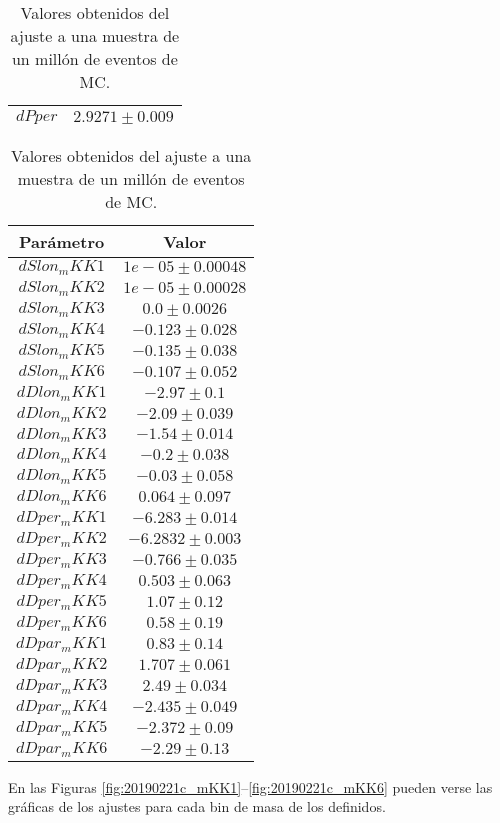 \begin{table}[H]
\begin{multicols}{2}
\begin{tabular}{cc}
$dPper     $&$  2.9271 \pm 0.009  $\\
\bottomrule
\end{tabular}
\begin{tabular}{cc}
\toprule
Parámetro & Valor \\ \midrule
$dSlon_mKK1$&$ 1e-05 \pm 0.00048  $\\
$dSlon_mKK2$&$ 1e-05 \pm 0.00028  $\\
$dSlon_mKK3$&$   0.0 \pm 0.0026   $\\
$dSlon_mKK4$&$  -0.123 \pm 0.028  $\\
$dSlon_mKK5$&$  -0.135 \pm 0.038  $\\
$dSlon_mKK6$&$  -0.107 \pm 0.052  $\\
$dDlon_mKK1$&$   -2.97 \pm 0.1    $\\
$dDlon_mKK2$&$  -2.09 \pm 0.039   $\\
$dDlon_mKK3$&$  -1.54 \pm 0.014   $\\
$dDlon_mKK4$&$   -0.2 \pm 0.038   $\\
$dDlon_mKK5$&$  -0.03 \pm 0.058   $\\
$dDlon_mKK6$&$  0.064 \pm 0.097   $\\
$dDper_mKK1$&$  -6.283 \pm 0.014  $\\
$dDper_mKK2$&$ -6.2832 \pm 0.003  $\\
$dDper_mKK3$&$  -0.766 \pm 0.035  $\\
$dDper_mKK4$&$  0.503 \pm 0.063   $\\
$dDper_mKK5$&$   1.07 \pm 0.12    $\\
$dDper_mKK6$&$   0.58 \pm 0.19    $\\
$dDpar_mKK1$&$   0.83 \pm 0.14    $\\
$dDpar_mKK2$&$  1.707 \pm 0.061   $\\
$dDpar_mKK3$&$   2.49 \pm 0.034   $\\
$dDpar_mKK4$&$  -2.435 \pm 0.049  $\\
$dDpar_mKK5$&$  -2.372 \pm 0.09   $\\
$dDpar_mKK6$&$   -2.29 \pm 0.13   $\\
\bottomrule
\end{tabular}
\end{multicols}
  \caption{Valores obtenidos del ajuste a una muestra de un millón de eventos  de MC.}
\end{table}

En las Figuras \ref{fig:20190221c_mKK1}--\ref{fig:20190221c_mKK6} pueden verse las gráficas de los ajustes para cada bin de masa de los definidos.

